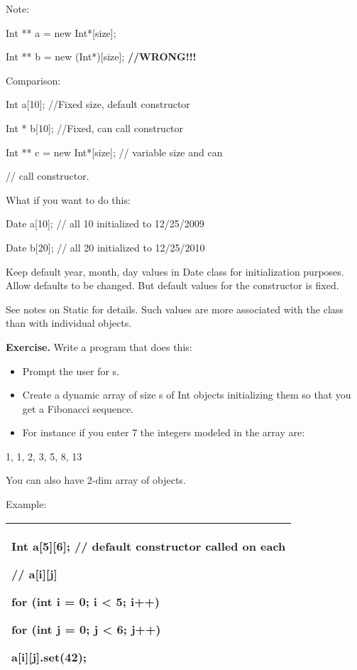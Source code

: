 \documentclass[
]{article}
\providecommand{\tightlist}{%
  \setlength{\itemsep}{0pt}\setlength{\parskip}{0pt}}
\begin{document}
Note:

Int ** a = new Int*{[}size{]};

Int ** b = new (Int*){[}size{]}; \textbf{//WRONG!!!}

Comparison:

Int a{[}10{]}; //Fixed size, default constructor

Int * b{[}10{]}; //Fixed, can call constructor

Int ** c = new Int*{[}size{]}; // variable size and can

// call constructor.

What if you want to do this:

Date a{[}10{]}; // all 10 initialized to 12/25/2009

Date b{[}20{]}; // all 20 initialized to 12/25/2010

Keep default year, month, day values in Date class for initialization
purposes. Allow defaults to be changed. But default values for the
constructor is fixed.

See notes on Static for details. Such values are more associated with
the class than with individual objects.

\textbf{Exercise. }Write a program that does this:

\begin{itemize}
\tightlist
\item
  Prompt the user for s.
\item
  Create a dynamic array of size s of Int objects initializing them so
  that you get a Fibonacci sequence.
\item
  For instance if you enter 7 the integers modeled in the array are:
\end{itemize}

1, 1, 2, 3, 5, 8, 13

You can also have 2-dim array of objects.

Example:

\begin{longtable}[]{@{}l@{}}
\toprule
\endhead
\begin{minipage}[t]{0.97\columnwidth}\raggedright
Int a{[}5{]}{[}6{]}; // default constructor called on each

// a{[}i{]}{[}j{]}

for (int i = 0; i \textless{} 5; i++)

for (int j = 0; j \textless{} 6; j++)

a{[}i{]}{[}j{]}.set(42);\strut
\end{minipage}\tabularnewline
\bottomrule
\end{longtable}
\end{document}
